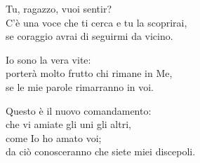 

\spazio

\strofa Tu, ragazzo, vuoi sentir?\\
C'è una voce che ti cerca e tu la scoprirai,\\
se coraggio avrai di seguirmi da vicino.

\spazio


\spazio

\strofa Io sono la vera vite:\\
porterà molto frutto chi rimane in Me,\\
se le mie parole rimarranno in voi.

\spazio


\spazio

\strofa Questo è il nuovo comandamento:\\
che vi amiate gli uni gli altri,\\
come Io ho amato voi;\\
da ciò conosceranno che siete miei discepoli.

\spazio

